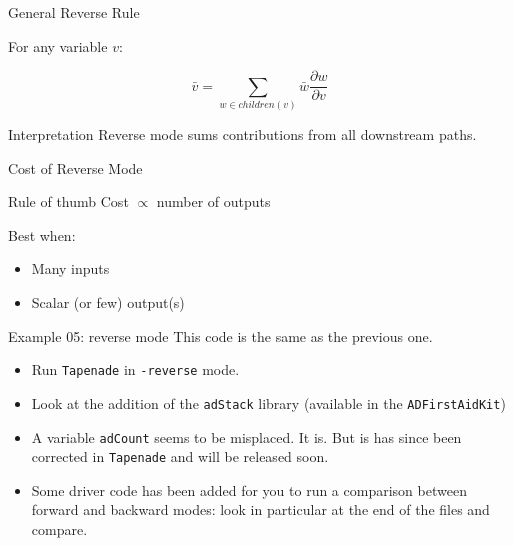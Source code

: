 \documentclass[12pt,xcolor={table}]{beamer}
\begin{document}
\begin{frame}{General Reverse Rule}

For any variable $v$:

\[
\bar{v} = \sum_{w\in children(v)}
\bar{w}\frac{\partial w}{\partial v}
\]

\begin{block}{Interpretation}
Reverse mode sums contributions from all downstream paths.
\end{block}

\end{frame}

\begin{frame}{Cost of Reverse Mode}

\begin{block}{Rule of thumb}
Cost $\propto$ number of outputs
\end{block}

Best when:

\begin{itemize}
\item Many inputs
\item Scalar (or few) output(s)
\end{itemize}

\end{frame}

\begin{frame}{Example 05: reverse mode}
  This code is the same as the previous one. 
  \begin{itemize}
    \item Run \texttt{Tapenade} in \texttt{-reverse} mode. 
    \item Look at the addition of the \texttt{adStack} library (available in the \texttt{ADFirstAidKit})
    \item A variable \texttt{adCount} seems to be misplaced. It is. But is has since been corrected in \texttt{Tapenade} and will be released soon.
    \item Some driver code has been added for you to run a comparison between forward and backward modes: look in particular at the end of the files and compare.
  \end{itemize}
\end{frame}
\end{document}
